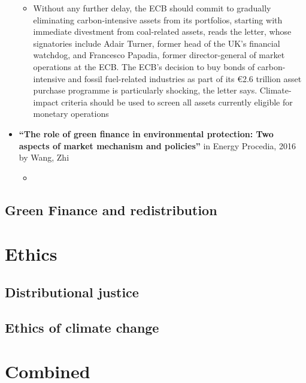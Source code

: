 \documentclass{article}
\begin{document}
\begin{itemize}
\begin{itemize}
	\item Without any further delay, the ECB should commit to gradually eliminating carbon-intensive assets from its portfolios, starting with immediate divestment from coal-related assets, reads the letter, whose signatories include Adair Turner, former head of the UK's financial watchdog, and Francesco Papadia, former director-general of market operations at the ECB.
		The ECB's decision to buy bonds of carbon-intensive and fossil fuel-related industries as part of its €2.6 trillion asset purchase programme is particularly shocking, the letter says. Climate-impact criteria should be used to screen all assets currently eligible for monetary operations
	
\end{itemize}
\item \textbf{``The role of green finance in environmental protection: Two aspects of market mechanism and policies''} in Energy Procedia, 2016  by Wang, Zhi
\begin{itemize}
	\item 
\end{itemize}

\end{itemize}
\subsection{Green Finance and redistribution}
\section{Ethics}
\subsection{Distributional justice}
\subsection{Ethics of climate change}
\section{Combined}
	
	\newpage
	
	
	
\end{document}
